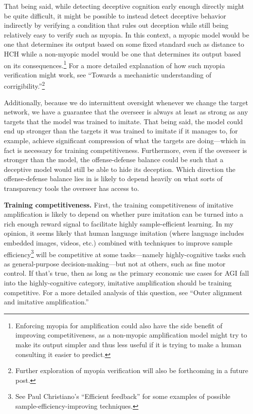 That being said, while detecting deceptive cognition early enough directly might be quite difficult, it might be possible to instead detect deceptive behavior indirectly by verifying a condition that rules out deception while still being relatively easy to verify such as myopia. In this context, a myopic model would be one that determines its output based on some fixed standard such as distance to HCH while a non-myopic model would be one that determines its output based on its consequences.\footnote{Enforcing myopia for amplification could also have the side benefit of improving competitiveness, as a non-myopic amplification model might try to make its output simpler and thus less useful if it is trying to make a human consulting it easier to predict.} For a more detailed explanation of how such myopia verification might work, see ``Towards a mechanistic understanding of corrigibility\cite{TODO: cite https://www.alignmentforum.org/posts/BKM8uQS6QdJPZLqCr/towards-a-mechanistic-understanding-of-corrigibility}.''\footnote{Further exploration of myopia verification will also be forthcoming in a future post.}

Additionally, because we do intermittent oversight whenever we change the target network, we have a guarantee that the overseer is always at least as strong as any targets that the model was trained to imitate. That being said, the model could end up stronger than the targets it was trained to imitate if it manages to, for example, achieve significant compression of what the targets are doing---which in fact is necessary for training competitiveness. Furthermore, even if the overseer is stronger than the model, the offense-defense balance could be such that a deceptive model would still be able to hide its deception. Which direction the offense-defense balance lies in is likely to depend heavily on what sorts of transparency tools the overseer has access to.

\textbf{Training competitiveness.} First, the training competitiveness of imitative amplification is likely to depend on whether pure imitation can be turned into a rich enough reward signal to facilitate highly sample-efficient learning. In my opinion, it seems likely that human language imitation (where language includes embedded images, videos, etc.) combined with techniques to improve sample efficiency\footnote{See Paul Christiano's ``Efficient feedback\cite{TODO: cite https://ai-alignment.com/efficient-feedback-a347748b1557}'' for some examples of possible sample-efficiency-improving techniques.} will be competitive at some tasks---namely highly-cognitive tasks such as general-purpose decision-making---but not at others, such as fine motor control. If that's true, then as long as the primary economic use cases for AGI fall into the highly-cognitive category, imitative amplification should be training competitive. For a more detailed analysis of this question, see ``Outer alignment and imitative amplification\cite{TODO: cite https://www.alignmentforum.org/posts/33EKjmAdKFn3pbKPJ/outer-alignment-and-imitative-amplification}.''

